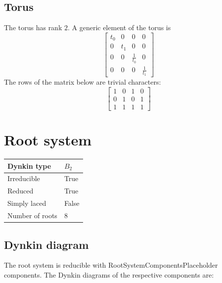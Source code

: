 \documentclass[11pt]{article}
\theoremstyle{definition}
\newif\ifrootsystemirreducible
\begin{document}
\subsection{Torus}

The torus has rank $2$. A generic element of the torus is
\[
\left[\begin{matrix}t_{0} & 0 & 0 & 0\\0 & t_{1} & 0 & 0\\0 & 0 & \frac{1}{t_{0}} & 0\\0 & 0 & 0 & \frac{1}{t_{1}}\end{matrix}\right]
\]
The rows of the matrix below are trivial characters:
\[
\left[\begin{matrix}1 & 0 & 1 & 0\\0 & 1 & 0 & 1\\1 & 1 & 1 & 1\end{matrix}\right]
\]

\newpage
\section{Root system}

\begin{tabular}{|l|l|}
	\hline
    Dynkin type & $B_2$ \\
	\hline
    Irreducible & True \\
	\hline
    Reduced & True \\
	\hline
	Simply laced & False \\
	\hline
	Number of roots & $8$ \\
	\hline
\end{tabular}

\subsection{Dynkin diagram}

\ifrootsystemirreducible
The root system is irreducible and has Dynkin diagram:
\else
The root system is reducible with RootSystemComponentsPlaceholder components. The Dynkin diagrams of the respective components are:
\fi

\end{document}

